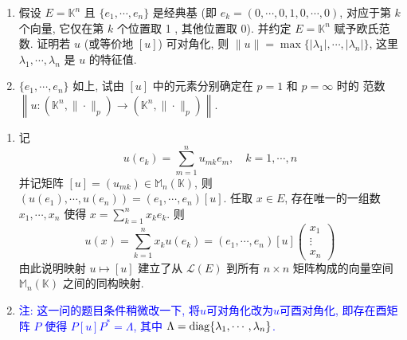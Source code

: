 \begin{enumerate}
\begin{enumerate}
      \item 假设 $E=\mathbb{K}^{n}$ 且 $\{e_1,\cdots,e_n\}$ 是经典基 
      (即 $e_{k}=(0, \cdots, 0,1,0, \cdots, 0)$, 对应于第 $k$ 个向量, 
      它仅在第 $k$ 个位置取 1 , 其他位置取 $0$). 
      并约定 $E=\mathbb{K}^{n}$ 赋予欧氏范数. 证明若 $u$ (或等价地 $[u]$) 可对角化, 
      则 $\|u\|=\max\{|\lambda_{1}|,\cdots,|\lambda_{n}|\}$, 这里 $\lambda_{1}, \cdots, \lambda_{n}$ 是 $u$ 的特征值.

      \item $\{e_{1}, \cdots, e_{n}\}$ 如上, 试由 $[u]$ 中的元素分别确定在 $p=1$ 和 $p=\infty$ 时的
      范数 $\left\|u:\left(\mathbb{K}^{n},\|\cdot\|_{p}\right)\rightarrow\left(\mathbb{K}^{n},\|\cdot\|_{p}\right)\right\|$.
    \end{enumerate}
    \begin{answer}
      \begin{enumerate}
        \item 记
        \[u(e_k)=\sum_{m=1}^n u_{mk}e_m,\quad k=1,\cdots,n\]
        并记矩阵 $[u]=(u_{mk})\in\mathbb{M}_n(\mathbb{K})$,
        则 $(u(e_1),\cdots,u(e_n))=(e_1,\cdots,e_n)[u]$.
        任取 $x\in E$, 存在唯一的一组数 $x_1,\cdots,x_n$ 使得 $x=\sum_{k=1}^n x_ke_k$. 则
        \[u(x)=\sum_{k=1}^n x_ku(e_k)=(e_1,\cdots,e_n)[u]
        \begin{pmatrix}
            x_1\\\vdots\\x_n
        \end{pmatrix}\]
        由此说明映射 $u\mapsto [u]$ 建立了从 $\mathcal{L}(E)$ 到所有 $n\times n$ 
        矩阵构成的向量空间 $\mathbb{M}_n(\mathbb{K})$ 之间的同构映射.
        
        \item \textcolor{blue}{注: 这一问的题目条件稍微改一下, 将$u$可对角化改为$u$可酉对角化,
        即存在酉矩阵 $P$ 使得 $P[u]P^{*}=\Lambda$, 其中 $\Lambda=\mathrm{diag}\{\lambda_1,\cdots,\lambda_n\}$.}
        

\end{enumerate}
\end{answer}
\end{enumerate}
